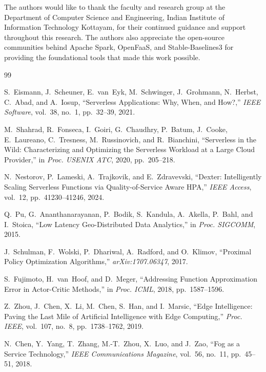 \documentclass[10pt, conference, compsocconf]{IEEEtran}
\begin{document}
The authors would like to thank the faculty and research group at the Department of Computer Science and Engineering, Indian Institute of Information Technology Kottayam, for their continued guidance and support throughout this research. The authors also appreciate the open-source communities behind Apache Spark, OpenFaaS, and Stable-Baselines3 for providing the foundational tools that made this work possible.

\begin{thebibliography}{99}

S.~Eismann, J.~Scheuner, E.~van~Eyk, M.~Schwinger, J.~Grohmann, N.~Herbst, C.~Abad, and A.~Iosup, ``Serverless Applications: Why, When, and How?,'' \emph{IEEE Software}, vol.~38, no.~1, pp.~32--39, 2021.

M.~Shahrad, R.~Fonseca, I.~Goiri, G.~Chaudhry, P.~Batum, J.~Cooke, E.~Laureano, C.~Tresness, M.~Russinovich, and R.~Bianchini, ``Serverless in the Wild: Characterizing and Optimizing the Serverless Workload at a Large Cloud Provider,'' in \emph{Proc. USENIX ATC}, 2020, pp.~205--218.

N.~Nestorov, P.~Lameski, A.~Trajkovik, and E.~Zdravevski, ``Dexter: Intelligently Scaling Serverless Functions via Quality-of-Service Aware HPA,'' \emph{IEEE Access}, vol.~12, pp.~41230--41246, 2024.

Q.~Pu, G.~Ananthanarayanan, P.~Bodik, S.~Kandula, A.~Akella, P.~Bahl, and I.~Stoica, ``Low Latency Geo-Distributed Data Analytics,'' in \emph{Proc. SIGCOMM}, 2015.

J.~Schulman, F.~Wolski, P.~Dhariwal, A.~Radford, and O.~Klimov, ``Proximal Policy Optimization Algorithms,'' \emph{arXiv:1707.06347}, 2017.

S.~Fujimoto, H.~van~Hoof, and D.~Meger, ``Addressing Function Approximation Error in Actor-Critic Methods,'' in \emph{Proc. ICML}, 2018, pp.~1587--1596.

Z.~Zhou, J.~Chen, X.~Li, M.~Chen, S.~Han, and I.~Marsic, ``Edge Intelligence: Paving the Last Mile of Artificial Intelligence with Edge Computing,'' \emph{Proc. IEEE}, vol.~107, no.~8, pp.~1738--1762, 2019.

N.~Chen, Y.~Yang, T.~Zhang, M.-T.~Zhou, X.~Luo, and J.~Zao, ``Fog as a Service Technology,'' \emph{IEEE Communications Magazine}, vol.~56, no.~11, pp.~45--51, 2018.


\end{thebibliography}
\end{document}
